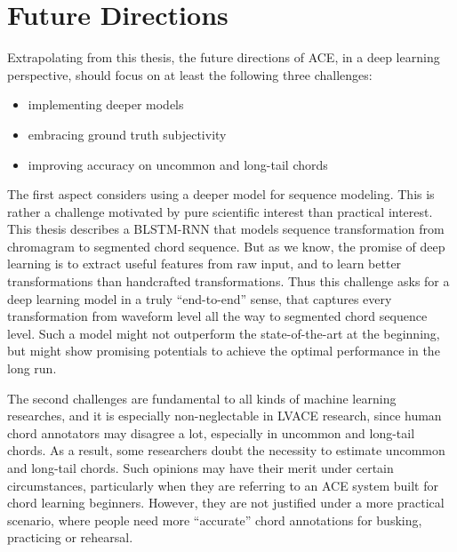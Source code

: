 
\section{Future Directions} \label{sec:6-future}


Extrapolating from this thesis, the future directions of ACE, in a deep learning perspective, should focus on at least the following three challenges:
\begin{itemize}
	\item implementing deeper models
	\item embracing ground truth subjectivity
	\item improving accuracy on uncommon and long-tail chords
\end{itemize}

The first aspect considers using a deeper model for sequence modeling. This is rather a challenge motivated by pure scientific interest than practical interest. This thesis describes a BLSTM-RNN that models sequence transformation from chromagram to segmented chord sequence. But as we know, the promise of deep learning is to extract useful features from raw input, and to learn better transformations than handcrafted transformations. Thus this challenge asks for a deep learning model in a truly ``end-to-end'' sense, that captures every transformation from waveform level all the way to segmented chord sequence level. Such a model might not outperform the state-of-the-art at the beginning, but might show promising potentials to achieve the optimal performance in the long run.

The second challenges are fundamental to all kinds of machine learning researches, and it is especially non-neglectable in LVACE research, since human chord annotators may disagree a lot, especially in uncommon and long-tail chords. As a result, some researchers doubt the necessity to estimate uncommon and long-tail chords. Such opinions may have their merit under certain circumstances, particularly when they are referring to an ACE system built for chord learning beginners. However, they are not justified under a more practical scenario, where people need more ``accurate'' chord annotations for busking, practicing or rehearsal.

